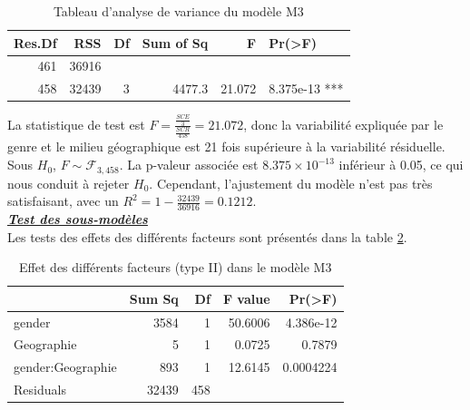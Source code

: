 \documentclass[12pt,a4paper]{article}
\begin{document}
\begin{enumerate}[label=\textbf{\alph*})]
	\begin{table}[H]
		\centering
		\caption{Tableau d'analyse de variance du modèle M3}
		\begin{tabular}{rrrrrl}
			\toprule
			\textbf{Res.Df} & \textbf{RSS} & \textbf{Df} & \textbf{Sum of Sq} & \textbf{F} & \textbf{Pr(>F)} \\
			\midrule
			461 & 36916 &    &         &         &        \\
			458 & 32439 &  3 & 4477.3  & 21.072  & 8.375e-13 *** \\
			\bottomrule
		\end{tabular}
		\label{tab:anova_results_3}
	\end{table}
	La statistique de test est $F = \frac{\frac{SCE}{3}}{\frac{SCR}{458}} = 21.072$, donc la variabilité expliquée par le genre et le milieu géographique est 21 fois supérieure à la variabilité résiduelle. Sous $H_0$, $F \sim \mathcal{F}_{3,458}$. La p-valeur associée est $8.375 \times 10^{-13}$ inférieur à 0.05, ce qui nous conduit à rejeter $H_0$. Cependant, l'ajustement du modèle n'est pas très satisfaisant, avec un $R^2 = 1 - \frac{32439}{36916} = 0.1212$. \\
	
	\noindent
	\textbf{\textit{\underline{Test des sous-modèles}}} \\
	
	Les tests des effets des différents facteurs sont présentés dans la table \ref{tab:test_effet_M3}. 
	\begin{table}[H]
		\centering
		\caption{Effet des différents facteurs (type II) dans le modèle M3}
		\begin{tabular}{lrrrr}
			\toprule
			& Sum Sq & Df & F value & Pr(>F)     \\
			\midrule
			gender            & 3584   & 1  & 50.6006 & 4.386e-12  \\
			Geographie        & 5      & 1  & 0.0725  & 0.7879     \\
			gender:Geographie & 893    & 1  & 12.6145 & 0.0004224  \\
			Residuals         & 32439  & 458 &         &            \\
			\bottomrule
		\end{tabular}
		\label{tab:test_effet_M3}
	\end{table}
	

\end{enumerate}
\end{document}
